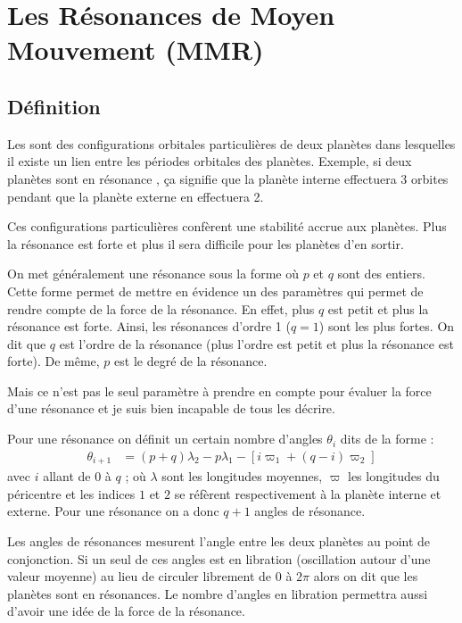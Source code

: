 \section{Les Résonances de Moyen Mouvement (MMR)}
\subsection{Définition}
Les  sont des configurations orbitales particulières de deux planètes
dans lesquelles il existe un lien entre les périodes orbitales des planètes. Exemple, si deux planètes sont en résonance
, ça signifie que la planète interne effectuera 3 orbites pendant que la planète externe en effectuera 2.

Ces configurations particulières confèrent une stabilité accrue aux planètes. Plus la résonance est forte et plus il sera difficile pour les planètes d'en sortir.

\bigskip

On met généralement une résonance sous la forme  où $p$ et $q$ sont des entiers. Cette forme permet de mettre en
évidence un des paramètres qui permet de rendre compte de la force de la résonance. En effet, plus $q$ est petit et plus la
résonance est forte. Ainsi, les résonances d'ordre 1 ($q=1$) sont les plus fortes. On dit que $q$ est l'ordre de la résonance
(plus l'ordre est petit et plus la résonance est forte). De même, $p$ est le degré de la résonance.

\begin{attention}
Mais ce n'est pas le seul paramètre à prendre en compte pour évaluer la force d'une résonance et je suis bien incapable de tous les décrire.
\end{attention}

Pour une résonance  on définit un certain nombre d'angles $\theta_i$ dits  de la forme :
\begin{align}
\theta_{i+1} &=(p+q)\lambda_2 -p\lambda_1 - \left[i\varpi_{1} + (q-i)\varpi_2\right]
\end{align}
avec $i$ allant de $0$ à $q$ ; où $\lambda$ sont les longitudes moyennes, $\varpi$ les longitudes du péricentre et les indices
$1$ et $2$ se réfèrent respectivement à la planète interne et externe. Pour une résonance  on a donc $q+1$ angles
de résonance.

Les angles de résonances mesurent l'angle entre les deux planètes au point de conjonction. Si un seul de ces angles est en libration (oscillation autour d'une valeur moyenne) au lieu de circuler librement de $0$ à $2\pi$ alors on dit que les planètes sont en résonances. Le nombre d'angles en libration permettra aussi d'avoir une idée de la force de la résonance.

